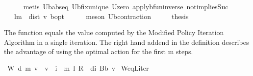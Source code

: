 \begin{isabellebody}
\ \ \ \ \isamarkupfalse%
\ {\isacharparenleft}{\kern0pt}metis\ U\isactrlsub b{\isachardot}{\kern0pt}abs{\isacharunderscore}{\kern0pt}eq\ U\isactrlsub b{\isacharunderscore}{\kern0pt}fix{\isacharunderscore}{\kern0pt}unique\ U{\isacharunderscore}{\kern0pt}zero\ apply{\isacharunderscore}{\kern0pt}bfun{\isacharunderscore}{\kern0pt}inverse\ not{}{\isacharunderscore}{\kern0pt}implies{\isacharunderscore}{\kern0pt}Suc{\isacharparenright}{\kern0pt}\isanewline
\ \ \isamarkupfalse%
\ \isamarkupfalse%
\ {\isachardoublequoteopen}{\isasymdots}\ {\isasymle}\ l{\isacharcircum}{\kern0pt}m\ {\isacharasterisk}{\kern0pt}\ dist\ v\ {\isasymnu}\isactrlsub b{\isacharunderscore}{\kern0pt}opt{\isachardoublequoteclose}\isanewline
\ \ \ \ \isamarkupfalse%
\ {\isacharparenleft}{\kern0pt}meson\ U\isactrlsub b{\isacharunderscore}{\kern0pt}contraction{\isacharparenright}{\kern0pt}\isanewline
\ \ \isamarkupfalse%
\ \isamarkupfalse%
\ {\isacharquery}{\kern0pt}thesis\ \isacommand{{\isachardot}{\kern0pt}}\isamarkupfalse%
\isanewline
{}\isamarkupfalse%
%
\endisatagproof
{\isafoldproof}%
%
\isadelimproof
%
\endisadelimproof
%
\isadelimdocument
%
\endisadelimdocument
%
\isatagdocument
%
\isamarkuptrue%
%
\endisatagdocument
{\isafolddocument}%
%
\isadelimdocument
%
\endisadelimdocument
%
\begin{isamarkuptext}%
The function  equals the value computed by the Modified Policy Iteration Algorithm
  in a single iteration.
  The right hand addend in the definition describes the advantage of using the optimal action for 
  the first m steps.%
\end{isamarkuptext}\isamarkuptrue%
\isamarkupfalse%
\ {\isachardoublequoteopen}W\ d\ m\ v\ {\isacharequal}{\kern0pt}\ v\ {\isacharplus}{\kern0pt}\ {\isacharparenleft}{\kern0pt}{\isasymSum}i\ {\isacharless}{\kern0pt}\ m{\isachardot}{\kern0pt}\ {\isacharparenleft}{\kern0pt}l\ {\isacharasterisk}{\kern0pt}\isactrlsub R\ {\isasymP}\ d{\isacharparenright}{\kern0pt}{\isacharcircum}{\kern0pt}{\isacharcircum}{\kern0pt}i{\isacharparenright}{\kern0pt}\ {\isacharparenleft}{\kern0pt}B\isactrlsub b\ v{\isacharparenright}{\kern0pt}{\isachardoublequoteclose}\isanewline
\isanewline
\isanewline
{}\isamarkupfalse%
\ W{\isacharunderscore}{\kern0pt}eq{\isacharunderscore}{\kern0pt}L{\isacharunderscore}{\kern0pt}iter{\isacharcolon}{\kern0pt}\isanewline

\end{isabellebody}
